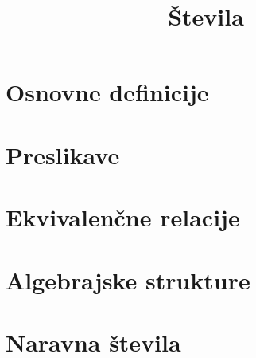 \documentclass[11pt]{article}
\title{Števila}
\begin{document}
    \maketitle
    \pagebreak

    \section{Osnovne definicije}
    
    \pagebreak

    \section{Preslikave}
    
    \pagebreak

    \section{Ekvivalenčne relacije}
    
    \pagebreak

    \section{Algebrajske strukture}
    
    \pagebreak

    \section{Naravna števila}
    
    \pagebreak
\end{document}
